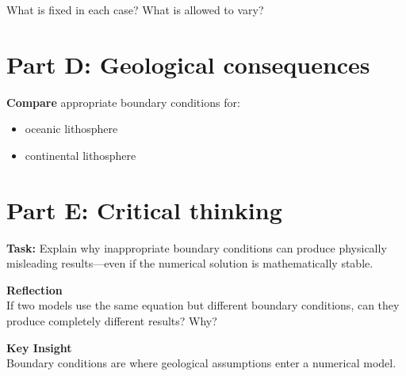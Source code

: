 \documentclass[11pt,a4paper]{article}
\begin{document}
What is fixed in each case? What is allowed to vary?

\section*{Part D: Geological consequences}

\textbf{Compare} appropriate boundary conditions for:
\begin{itemize}
    \item oceanic lithosphere
    \item continental lithosphere
\end{itemize}

\section*{Part E: Critical thinking}

\textbf{Task:}
Explain why inappropriate boundary conditions can produce physically misleading
results—even if the numerical solution is mathematically stable.

\textbf{Reflection} \\
If two models use the same equation but different boundary conditions, can they
produce completely different results? Why?

\bigskip

\textbf{Key Insight} \\
Boundary conditions are where geological assumptions enter a numerical model.
\end{document}

